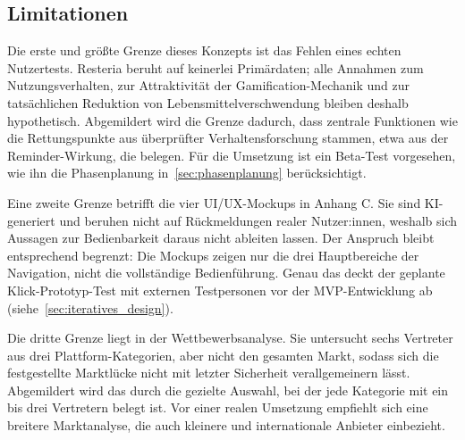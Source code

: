 \subsection{Limitationen}\label{sec:limitationen}

Die erste und größte Grenze dieses Konzepts ist das Fehlen eines echten Nutzertests. Resteria beruht auf keinerlei Primärdaten; alle Annahmen zum Nutzungsverhalten, zur Attraktivität der Gamification-Mechanik und zur tatsächlichen Reduktion von Lebensmittelverschwendung bleiben deshalb hypothetisch. Abgemildert wird die Grenze dadurch, dass zentrale Funktionen wie die Rettungspunkte aus überprüfter Verhaltensforschung stammen, etwa aus der Reminder-Wirkung, die \textcite[S. 10]{barkerWhatNudgeTechniques2021} belegen. Für die Umsetzung ist ein Beta-Test vorgesehen, wie ihn die Phasenplanung in~\autoref{sec:phasenplanung} berücksichtigt.

Eine zweite Grenze betrifft die vier UI/UX-Mockups in Anhang C. Sie sind KI-generiert und beruhen nicht auf Rückmeldungen realer Nutzer:innen, weshalb sich Aussagen zur Bedienbarkeit daraus nicht ableiten lassen. Der Anspruch bleibt entsprechend begrenzt: Die Mockups zeigen nur die drei Hauptbereiche der Navigation, nicht die vollständige Bedienführung. Genau das deckt der geplante Klick-Prototyp-Test mit externen Testpersonen vor der \ac{MVP}-Entwicklung ab (siehe~\autoref{sec:iteratives_design}).

Die dritte Grenze liegt in der Wettbewerbsanalyse. Sie untersucht sechs Vertreter aus drei Plattform-Kategorien, aber nicht den gesamten Markt, sodass sich die festgestellte Marktlücke nicht mit letzter Sicherheit verallgemeinern lässt. Abgemildert wird das durch die gezielte Auswahl, bei der jede Kategorie mit ein bis drei Vertretern belegt ist. Vor einer realen Umsetzung empfiehlt sich eine breitere Marktanalyse, die auch kleinere und internationale Anbieter einbezieht.
